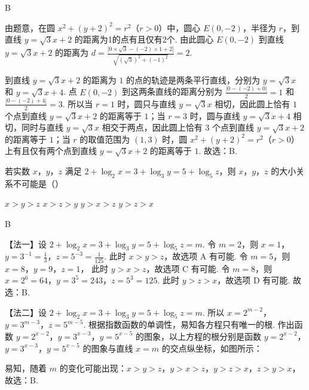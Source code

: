 \documentclass[UTF8,a4paper,oneside,11pt]{ctexbook}
\begin{document}
\begin{answer}
B
\end{answer}

\begin{solution}
由题意，在圆 \(x^2 + (y+2)^2 = r^2\)（\(r>0\)）中，圆心 \(E(0,-2)\)，半径为 \(r\)，到直线 \(y = \sqrt{3}x + 2\) 的距离为1的点有且仅有2个.
由此圆心 \(E(0,-2)\) 到直线 \(y = \sqrt{3}x + 2\) 的距离为 \(d=\frac{\left|0 \times \sqrt{3}-(-2) \times 1+2\right|}{\sqrt{(\sqrt{3})^2+(-1)^2}}=2\).


到直线 \(y=\sqrt{3}x+2\) 的距离为 \(1\) 的点的轨迹是两条平行直线，分别为 \(y=\sqrt{3}x\) 和 \(y=\sqrt{3}x+4\). 点 \(E(0,-2)\) 到这两条直线的距离分别为 \(\frac{|0-(-2)+0|}{2}=1\) 和 \(\frac{|0-(-2)+4|}{2}=3\). 所以当 \(r=1\) 时，圆只与直线 \(y=\sqrt{3}x\) 相切，因此圆上恰有 \(1\) 个点到直线 \(y = \sqrt{3}x + 2\) 的距离等于 \(1\)；当 \(r=3\) 时，圆与直线 \(y=\sqrt{3}x+4\) 相切，同时与直线 \(y=\sqrt{3}x\) 相交于两点，因此圆上恰有 \(3\) 个点到直线 \(y = \sqrt{3}x + 2\) 的距离等于 \(1\)；当 \(r\) 的取值范围为 \((1,3)\) 时，圆 \(x^2 + (y+2)^2 = r^2\)（\(r>0\)）上有且仅有两个点到直线 \(y = \sqrt{3}x + 2\) 的距离等于 \(1\). 故选：B.
\end{solution}

\begin{problem}
若实数 \(x\)，\(y\)，\(z\) 满足 \(2 + \log_2 x = 3 + \log_3 y = 5 + \log_5 z\)，则 \(x\)，\(y\)，\(z\) 的大小关系不可能是（\quad）

\choices
    {\(x > y > z\)}
    {\(x > z > y\)}
    {\(y > x > z\)}
    {\(y > z > x\)}
\end{problem}

\begin{answer}
B
\end{answer}

\begin{solution}
【法一】设 \(2 + \log_2 x = 3 + \log_3 y = 5 + \log_5 z = m\). 令 \(m = 2\)，则
\(x = 1\)，\(y = 3^{-1} = \frac{1}{3}\)，\(z = 5^{-3} = \frac{1}{125}\).
此时 \(x > y > z\)，故选项 A 有可能. 令 \(m = 5\)，则
\(x = 8\)，\(y = 9\)，\(z = 1\)，
此时 \(y > x > z\)，故选项 C 有可能. 令 \(m = 8\)，则
\(x = 2^6 = 64\)，\(y = 3^5 = 243\)，\(z = 5^3 = 125\).
此时 \(y > z > x\)，故选项 D 有可能. 故选：B.

【法二】设 \(2 + \log_2 x = 3 + \log_3 y = 5 + \log_5 z = m\). 所以 \(x = 2^{m-2}\)，\(y = 3^{m-3}\)，\(z = 5^{m-5}\).
根据指数函数的单调性，易知各方程只有唯一的根. 作出函数 \(y = 2^{x-2}\)，\(y = 3^{x-3}\)，\(y = 5^{x-5}\) 的图象，以上方程的根分别是函数 \(y = 2^{x-2}\)，\(y = 3^{x-3}\)，\(y = 5^{x-5}\) 的图象与直线 \(x = m\) 的交点纵坐标，如图所示：


易知，随着 \(m\) 的变化可能出现：\(x > y > z\)，\(y > x > z\)，\(y > z > x\)，\(z > y > x\)，故选：B.
\end{solution}
\end{document}
